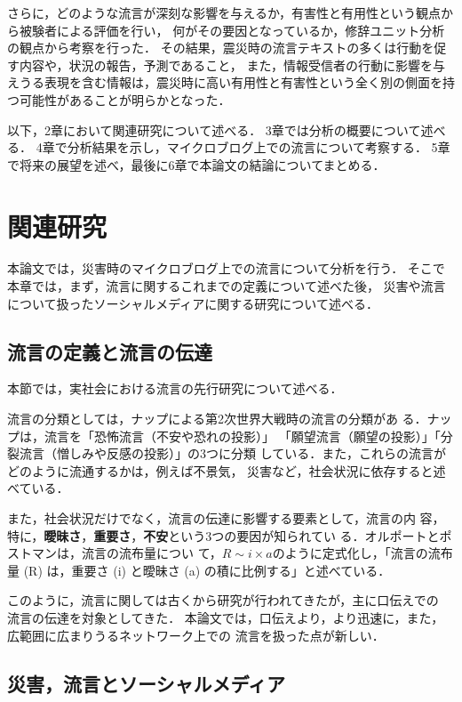 \documentclass[japanese]{jnlp_1.4}
\begin{document}
さらに，どのような流言が深刻な影響を与えるか，有害性と有用性という観点から被験者による評価を行い，
何がその要因となっているか，修辞ユニット分析の観点から考察を行った．
その結果，震災時の流言テキストの多くは行動を促す内容や，状況の報告，予測であること，
また，情報受信者の行動に影響を与えうる表現を含む情報は，震災時に高い有用性と有害性という全く別の側面を持つ可能性があることが明らかとなった．

以下，2章において関連研究について述べる．
3章では分析の概要について述べる．
4章で分析結果を示し，マイクロブログ上での流言について考察する．
5章で将来の展望を述べ，最後に6章で本論文の結論についてまとめる．


\section{関連研究}\label{sec:reference}

本論文では，災害時のマイクロブログ上での流言について分析を行う．
そこで本章では，まず，流言に関するこれまでの定義について述べた後，
災害や流言について扱ったソーシャルメディアに関する研究について述べる．


\subsection{流言の定義と流言の伝達}

本節では，実社会における流言の先行研究について述べる．

流言の分類としては，ナップによる第2次世界大戦時の流言の分類があ
る\cite{ナップ1944}．ナップは，流言を「恐怖流言（不安や恐れの投影）」
「願望流言（願望の投影）」「分裂流言（憎しみや反感の投影）」の3つに分類
している．また，これらの流言がどのように流通するかは，例えば不景気，
災害など，社会状況に依存すると述べている．

また，社会状況だけでなく，流言の伝達に影響する要素として，流言の内
容，特に，{\bf 曖昧さ}，{\bf 重要さ}，{\bf 不安}という3つの要因が知られてい
る\cite{Book_Kawakami}．オルポートとポストマンは，流言の流布量につい
て，$R \sim i \times a$のように定式化し，「流言の流布量 (R) は，重要さ
 (i) と曖昧さ (a) の積に比例する」と述べている\cite{Book_dema}．

このように，流言に関しては古くから研究が行われてきたが，主に口伝えでの
流言の伝達を対象としてきた．
本論文では，口伝えより，より迅速に，また，広範囲に広まりうるネットワーク上での
流言を扱った点が新しい．


\subsection{災害，流言とソーシャルメディア}
\end{document}
